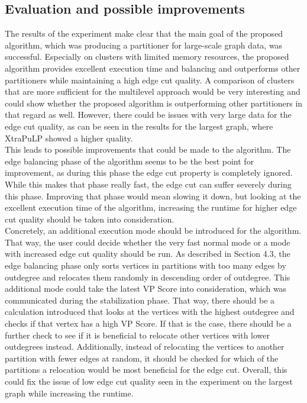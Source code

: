 \documentclass[acmsmall,nonacm,screen,review]{acmart}
\begin{document}
\subsection{Evaluation and possible improvements}
The results of the experiment make clear that the main goal of the proposed algorithm, which was producing a partitioner for large-scale graph data, was successful. Especially on clusters with limited memory resources, the proposed algorithm provides excellent execution time and balancing and outperforms other partitioners while maintaining a high edge cut quality. A comparison of clusters that are more sufficient for the multilevel approach would be very interesting and could show whether the proposed algorithm is outperforming other partitioners in that regard as well. However, there could be issues with very large data for the edge cut quality, as can be seen in the results for the largest graph, where XtraPuLP showed a higher quality. \\
This leads to possible improvements that could be made to the algorithm. The edge balancing phase of the algorithm seems to be the best point for improvement, as during this phase the edge cut property is completely ignored. While this makes that phase really fast, the edge cut can suffer severely during this phase. Improving that phase would mean slowing it down, but looking at the excellent execution time of the algorithm, increasing the runtime for higher edge cut quality should be taken into consideration. \\
Concretely, an additional execution mode should be introduced for the algorithm. That way, the user could decide whether the very fast normal mode or a mode with increased edge cut quality should be run. As described in Section 4.3, the edge balancing phase only sorts vertices in partitions with too many edges by outdegree and relocates them randomly in descending order of outdegree. This additional mode could take the latest VP Score into consideration, which was communicated during the stabilization phase. That way, there should be a calculation introduced that looks at the vertices with the highest outdegree and checks if that vertex has a high VP Score. If that is the case, there should be a further check to see if it is beneficial to relocate other vertices with lower outdegrees instead. Additionally, instead of relocating the vertices to another partition with fewer edges at random, it should be checked for which of the partitions a relocation would be most beneficial for the edge cut. Overall, this could fix the issue of low edge cut quality seen in the experiment on the largest graph while increasing the runtime. 
\end{document}
